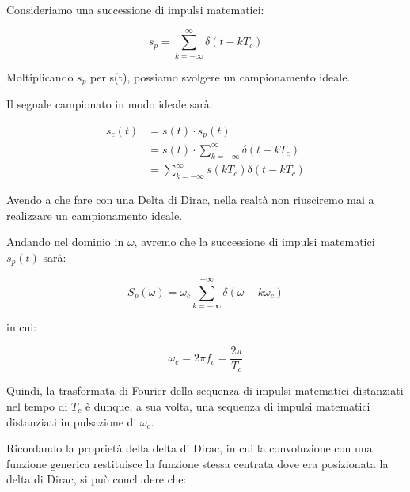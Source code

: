 Consideriamo una successione di impulsi matematici: 

{
    \Large 
    \begin{equation}
        s_p 
        = 
        \sum_{k = -\infty}^{\infty} 
        \delta (t - k T_c)
    \end{equation}
}

Moltiplicando $s_p$ per s(t), possiamo svolgere un campionamento ideale. \newline 

Il segnale campionato in modo ideale sarà: 

{
    \Large 
    \begin{equation}
        \begin{split}
            s_c (t) 
            &= 
            s(t) \cdot s_p (t) 
            \\ 
            &= 
            s(t) \cdot \sum_{k = -\infty}^{\infty} \delta (t - k T_c)
            \\ 
            &= 
            \sum_{k = -\infty}^{\infty} s(k T_c) \delta (t - k T_c)
        \end{split} 
    \end{equation}
}

Avendo a che fare con una Delta di Dirac, nella realtà non riusciremo mai a realizzare un campionamento ideale. \newline 

Andando nel dominio in $\omega$, avremo che la successione di impulsi matematici $s_p (t)$ sarà: 

{
    \Large 
    \begin{equation}
        S_p (\omega) 
        = 
        \omega_c \sum_{k = - \infty}^{+ \infty} \delta (\omega - k \omega_c)    
    \end{equation}
}

in cui: 

{
    \Large 
    \begin{equation}
        \omega_c = 2\pi f_c = \frac{2\pi}{T_c}
    \end{equation}
}

Quindi, la trasformata di Fourier della sequenza di impulsi matematici distanziati nel tempo di $T_c$ è dunque, 
a sua volta, una sequenza di impulsi matematici distanziati in pulsazione di $\omega_c$. \newline 

Ricordando la proprietà della delta di Dirac, in cui la convoluzione con una funzione generica restituisce la funzione stessa centrata 
dove era posizionata la delta di Dirac, si può concludere che: 

